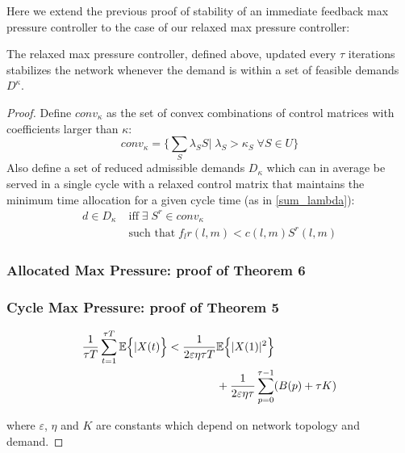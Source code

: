 Here we extend the previous proof of stability of an immediate feedback max pressure controller to the case of our relaxed max pressure controller: 

\begin{Thm}\label{stabRelaxMP}
The relaxed max pressure controller, defined above, updated every $\tau$ iterations stabilizes the network whenever the demand is within a set of feasible demands $D^{\kappa}$.
\end{Thm}

\begin{proof}

Define $conv_{\kappa}$ as the set of convex combinations of control matrices with coefficients larger than $\kappa$:
\begin{equation}
conv_{\kappa} = \Big\{ \sum_{S}\lambda_{S}S \big| \; \lambda_S > \kappa_S \; \forall S\in U\Big\}
\end{equation}
Also define a set of reduced admissible demands $D_{\kappa}$ which can in average be served in a single cycle with a relaxed control matrix that maintains the minimum time allocation for a given cycle time (as in \eqref{sum_lambda}):
\begin{align} \nonumber
d \in D_{\kappa} \; & \text{iff} \; \exists \; S^r \in conv_{\kappa} \; \\ & \text{such that} \; f_{l}r(l,m) < c(l,m)S^r(l,m)
\label{admissible_relaxed}
\end{align} 

%
%
\subsubsection*{Allocated Max Pressure: proof of Theorem 6}

\subsubsection*{Cycle Max Pressure: proof of Theorem 5}




\begin{align} \label{CYCLE_BOUNDS}
\dfrac{1}{\tau T} \displaystyle\sum_{t=1}^{\tau T} \expectation{\vert X(t)}< \dfrac{1}{2\varepsilon\eta\tau T}& \expectation{\vert X(1) \vert^{2}} \\ \nonumber
& + \dfrac{1}{2\varepsilon\eta\tau}\displaystyle\sum_{p=0}^{\tau - 1} (B(p) + \tau K)
\end{align}

where $\varepsilon$, $\eta$ and $K$ are constants which depend on network topology and demand.

\end{proof}

